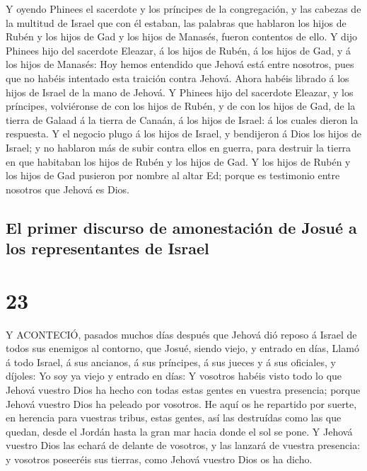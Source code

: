  Y oyendo Phinees el sacerdote y los príncipes de la
congregación, y las cabezas de la multitud de Israel que con él estaban,
las palabras que hablaron los hijos de Rubén y los hijos de Gad y los
hijos de Manasés, fueron contentos de ello.  Y dijo Phinees
hijo del sacerdote Eleazar, á los hijos de Rubén, á los hijos de Gad, y
á los hijos de Manasés: Hoy hemos entendido que Jehová está entre
nosotros, pues que no habéis intentado esta traición contra Jehová.
Ahora habéis librado á los hijos de Israel de la mano de Jehová.
 Y Phinees hijo del sacerdote Eleazar, y los príncipes,
volviéronse de con los hijos de Rubén, y de con los hijos de Gad, de la
tierra de Galaad á la tierra de Canaán, á los hijos de Israel: á los
cuales dieron la respuesta.  Y el negocio plugo á los hijos
de Israel, y bendijeron á Dios los hijos de Israel; y no hablaron más de
subir contra ellos en guerra, para destruir la tierra en que habitaban
los hijos de Rubén y los hijos de Gad.  Y los hijos de
Rubén y los hijos de Gad pusieron por nombre al altar Ed; porque es
testimonio entre nosotros que Jehová es Dios.

\hypertarget{el-primer-discurso-de-amonestaciuxf3n-de-josuuxe9-a-los-representantes-de-israel}{%
\subsection{El primer discurso de amonestación de Josué a los
representantes de
Israel}\label{el-primer-discurso-de-amonestaciuxf3n-de-josuuxe9-a-los-representantes-de-israel}}

\hypertarget{section-22}{%
\section{23}\label{section-22}}

 Y ACONTECIÓ, pasados muchos días después que Jehová dió
reposo á Israel de todos sus enemigos al contorno, que Josué, siendo
viejo, y entrado en días,  Llamó á todo Israel, á sus
ancianos, á sus príncipes, á sus jueces y á sus oficiales, y díjoles: Yo
soy ya viejo y entrado en días:  Y vosotros habéis visto
todo lo que Jehová vuestro Dios ha hecho con todas estas gentes en
vuestra presencia; porque Jehová vuestro Dios ha peleado por vosotros.
 He aquí os he repartido por suerte, en herencia para
vuestras tribus, estas gentes, así las destruídas como las que quedan,
desde el Jordán hasta la gran mar hacia donde el sol se pone.
 Y Jehová vuestro Dios las echará de delante de vosotros, y
las lanzará de vuestra presencia: y vosotros poseeréis sus tierras, como
Jehová vuestro Dios os ha dicho.

